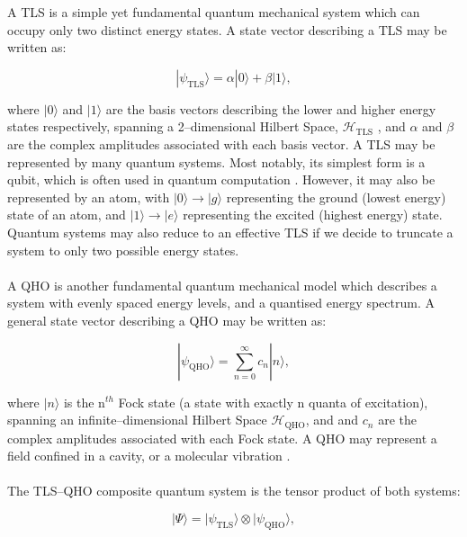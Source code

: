 \documentclass[11pt]{article}
\begin{document}
A TLS is a simple yet fundamental quantum mechanical system which can occupy only two distinct energy states. A state vector describing a TLS may be written as:

\begin{equation}
    |\psi_{\scriptscriptstyle \text{TLS}}\rangle = \alpha|0\rangle + \beta|1\rangle,
\end{equation}

where $|0\rangle$ and $|1\rangle$ are the basis vectors describing the lower and higher energy states respectively, spanning a 2--dimensional Hilbert Space, $\mathcal{H}_{\scriptscriptstyle \text{TLS}}$ , and $\alpha$ and $\beta$ are the complex amplitudes associated with each basis vector. A TLS may be represented by many quantum systems. Most notably, its simplest form is a qubit, which is often used in quantum computation \cite{TLS2024-qubits}. However, it may also be represented by an atom, with $|0\rangle \rightarrow |g\rangle$ representing the ground (lowest energy) state of an atom, and $|1\rangle \rightarrow |e\rangle$ representing the excited (highest energy) state. Quantum systems may also reduce to an effective TLS if we decide to truncate a system to only two possible energy states. \\
\\
A QHO is another fundamental quantum mechanical model which describes a system with evenly spaced energy levels, and a quantised energy spectrum. A general state vector describing a QHO may be written as:

\begin{equation}
|\psi_{\scriptscriptstyle \text{QHO}}\rangle = \sum_{n=0}^\infty c_n |n\rangle,
\end{equation}

where $|n\rangle$ is the n$^{th}$ Fock state (a state with exactly n quanta of excitation), spanning an infinite--dimensional Hilbert Space $\mathcal{H}_{\scriptscriptstyle \text{QHO}}$, and and $c_n$ are the complex amplitudes associated with each Fock state. A QHO may represent a field confined in a cavity, or a molecular vibration \cite{Context2004-CQED_JCM}.\\
\\
The TLS--QHO composite quantum system is the tensor product of both systems:

\begin{equation}
    |\Psi\rangle = |\psi_{\scriptscriptstyle \text{TLS}}\rangle \otimes |\psi_{\scriptscriptstyle \text{QHO}}\rangle,
\end{equation}
\end{document}
